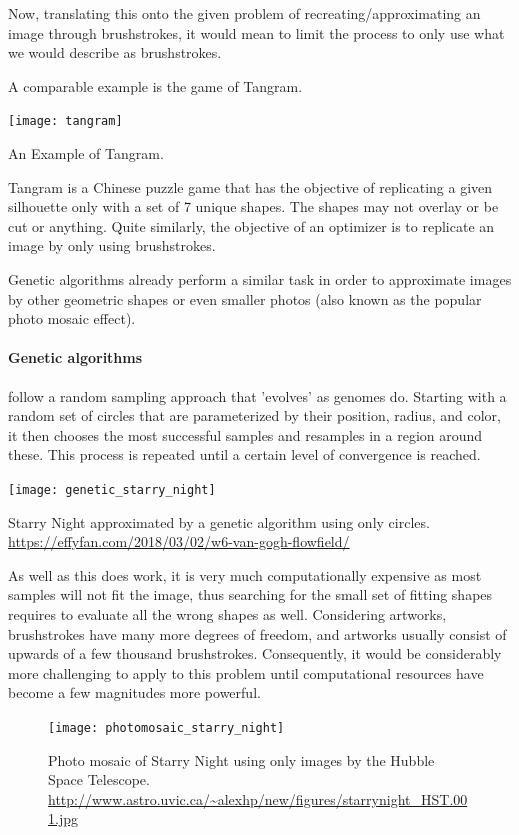 Now, translating this onto the given problem of recreating/approximating an image through brushstrokes, it would mean to limit the process to only use what we would describe as brushstrokes. 

A comparable example is the game of Tangram.

\begin{marginfigure}
    \texttt{[image: tangram]}
    \caption[]{An Example of Tangram.}
\end{marginfigure}

Tangram is a Chinese puzzle game that has the objective of replicating a given silhouette only with a set of 7 unique shapes.
The shapes may not overlay or be cut or anything.
Quite similarly, the objective of an optimizer is to replicate an image by only using brushstrokes.


Genetic algorithms already perform a similar task in order to approximate images by other geometric shapes or even smaller photos (also known as the popular photo mosaic effect).
\paragraph{Genetic algorithms} follow a random sampling approach that 'evolves' as genomes do.
Starting with a random set of circles that are parameterized by their position, radius, and color, it then chooses the most successful samples and resamples in a region around these.
This process is repeated until a certain level of convergence is reached.

\begin{marginfigure}
    \texttt{[image: genetic\_starry\_night]}
    \caption[]{Starry Night approximated by a genetic algorithm using only circles. \url{https://effyfan.com/2018/03/02/w6-van-gogh-flowfield/}}
\end{marginfigure}

As well as this does work, it is very much computationally expensive as most samples will not fit the image, thus searching for the small set of fitting shapes requires to evaluate all the wrong shapes as well.
Considering artworks, brushstrokes have many more degrees of freedom, and artworks usually consist of upwards of a few thousand brushstrokes.
Consequently, it would be considerably more challenging to apply to this problem until computational resources have become a few magnitudes more powerful.

\begin{figure}
    \texttt{[image: photomosaic\_starry\_night]}
    \caption[]{Photo mosaic of Starry Night using only images by the Hubble Space Telescope. \url{http://www.astro.uvic.ca/~alexhp/new/figures/starrynight_HST.001.jpg}}
\end{figure}

